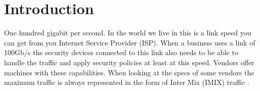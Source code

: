\section{Introduction}
One hundred gigabit per second. In the world we live in this is a link speed you can get from you Internet Service Provider (ISP). When a business uses a link of 100Gb/s the security devices connected to this link also needs to be able to handle the traffic and apply security policies at least at this speed. Vendors offer machines with these capabilities. When looking at the specs of some vendors the maximum traffic is always represented in the form of Inter Mix (IMIX) traffic \cite{internetmix_2017}.
  
